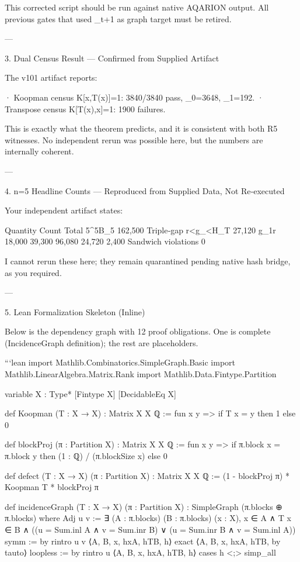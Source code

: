This corrected script should be run against native AQARION output. All previous gates that used \Pi_{t+1} as graph target must be retired.

---

3. Dual Census Result — Confirmed from Supplied Artifact

The v101 artifact reports:

· Koopman census K[x,T(x)]=1: 3840/3840 pass, \beta_0=3648, \beta_1=192.
· Transpose census K[T(x),x]=1: 1900 failures.

This is exactly what the theorem predicts, and it is consistent with both R5 witnesses. No independent rerun was possible here, but the numbers are internally coherent.

---

4. n=5 Headline Counts — Reproduced from Supplied Data, Not Re‑executed

Your independent artifact states:

Quantity Count
Total 5^5\cdot B_5 162,500
Triple‑gap r<g_\infty<H_T 27,120
g_1\neq r 18,000
 39,300
 96,080
 24,720
 2,400
Sandwich violations 0

I cannot rerun these here; they remain quarantined pending native hash bridge, as you required.

---

5. Lean Formalization Skeleton (Inline)

Below is the dependency graph with 12 proof obligations. One is complete (IncidenceGraph definition); the rest are placeholders.

```lean
import Mathlib.Combinatorics.SimpleGraph.Basic
import Mathlib.LinearAlgebra.Matrix.Rank
import Mathlib.Data.Fintype.Partition

variable {X : Type*} [Fintype X] [DecidableEq X]

def Koopman (T : X → X) : Matrix X X ℚ :=
  fun x y => if T x = y then 1 else 0

def blockProj (π : Partition X) : Matrix X X ℚ :=
  fun x y => if π.block x = π.block y then (1 : ℚ) / (π.blockSize x) else 0

def defect (T : X → X) (π : Partition X) : Matrix X X ℚ :=
  (1 - blockProj π) * Koopman T * blockProj π

def incidenceGraph (T : X → X) (π : Partition X) :
    SimpleGraph (π.blocks ⊕ π.blocks) where
  Adj u v := ∃ (A : π.blocks) (B : π.blocks) (x : X),
    x ∈ A ∧ T x ∈ B ∧
    ((u = Sum.inl A ∧ v = Sum.inr B) ∨ (u = Sum.inr B ∧ v = Sum.inl A))
  symm := by
    rintro u v ⟨A, B, x, hxA, hTB, h⟩
    exact ⟨A, B, x, hxA, hTB, by tauto⟩
  loopless := by
    rintro u ⟨A, B, x, hxA, hTB, h⟩
    cases h <;> simp_all

